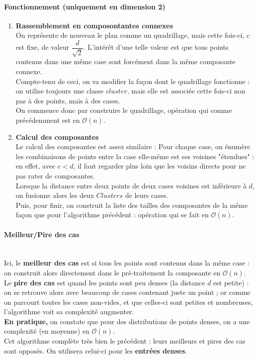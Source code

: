 \documentclass[a4paper,11pt]{article}
\begin{document}
	\paragraph{Fonctionnement (uniquement en dimension 2)}
	\begin{enumerate}
		\item \textbf{Rassemblement en composontantes connexes} \\
		On représente de nouveau le plan comme un quadrillage, mais cette fois-ci, $c$ est fixe, de valeur $\dfrac{d}{\sqrt{2}}$. L'intérêt d'une telle valeur est que tous points contenus dans une même case sont forcément dans la même composante connexe.\\
		Compte-tenu de ceci, on va modifier la façon dont le quadrillage fonctionne : on utilise toujours une classe $cluster$, mais elle est associée cette fois-ci non pas à des points, mais à des cases.\\
		On commence donc par construire le quadrillage, opération qui comme précédemment est en $\mathcal{O}(n)$.
		
	 \item \textbf{Calcul des composantes} \\
	 	Le calcul des composantes est assez similaire : Pour chaque case, on énumère les combinaisons de points entre la case elle-même est ses voisines "étendues" : en effet, avec $c < d$, il faut regarder plus loin que les voisins directs pour ne pas rater de composantes.\\
	 	Lorsque la distance entre deux points de deux cases voisines est inférieure à $d$, on fusionne alors les deux $Clusters$ de leurs cases.\\
	 	Puis, pour finir, on construit la liste des tailles des composantes de la même façon que pour l'algorithme précédent : opération qui se fait en $\mathcal{O}(n)$.
	
	\end{enumerate}
\paragraph{Meilleur/Pire des cas} \mbox{} \\
Ici, le \textbf{meilleur des cas} est si tous les points sont contenus dans la même case : on construit alors directement dans le pré-traitement la composante en $\mathcal{O}(n)$.\\
Le \textbf{pire des cas} est quand les points sont peu denses (la distance $d$ est petite) : on se retrouve alors avec beaucoup de cases contenant juste un point ; or comme on parcourt toutes les cases non-vides, et que celles-ci sont petites et nombreuses, l'algorithme voit sa complexité augmenter.\\
\textbf{En pratique,} on constate que pour des distributions de points denses, on a une complexité (en moyenne) en $\mathcal{O}(n)$.\\
Cet algorithme complète très bien le précédent : leurs meilleurs et pires des cas sont opposés. On utilisera celui-ci pour les \textbf{entrées denses}.\\
\end{document}
